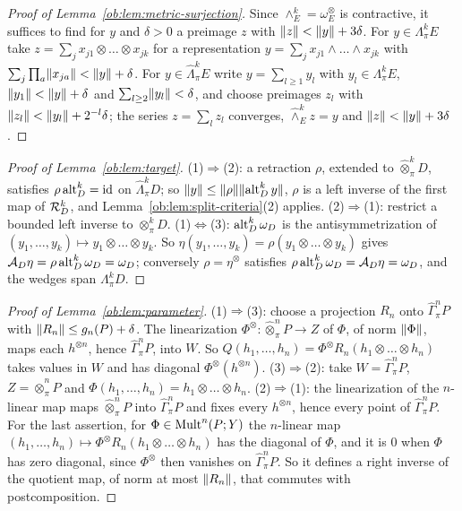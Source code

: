 \begin{proof}[Proof of Lemma~\ref{ob:lem:metric-surjection}]
Since $\wedge^k_E=\omega_E^\otimes$ is contractive, it suffices to find for $y$ and $\delta>0$ a preimage $z$ with
$\lVert z\rVert<\lVert y\rVert+3\delta$. For $y\in\Lambda^k_\pi E$ take $z=\sum_jx_{j1}\otimes\dots\otimes x_{jk}$ for a representation
$y=\sum_jx_{j1}\wedge\dots\wedge x_{jk}$ with $\sum_j\prod_a\lVert x_{ja}\rVert<\lVert y\rVert+\delta$. For
$y\in\widehat\Lambda^k_\pi E$ write $y=\sum_{l\ge1}y_l$ with $y_l\in\Lambda^k_\pi E$, $\lVert y_1\rVert<\lVert y\rVert+\delta$ and
$\sum_{l\ge2}\lVert y_l\rVert<\delta$, and choose preimages $z_l$ with $\lVert z_l\rVert<\lVert y_l\rVert+2^{-l}\delta$; the series
$z=\sum_lz_l$ converges, $\widehat\wedge^k_Ez=y$ and $\lVert z\rVert<\lVert y\rVert+3\delta$.
\end{proof}

\begin{proof}[Proof of Lemma~\ref{ob:lem:target}]
(1)$\Rightarrow$(2): a retraction $\rho$, extended to $\widehat\otimes^k_\pi D$, satisfies $\rho\operatorname{alt}^k_D=\mathrm{id}$ on
$\widehat\Lambda^k_\pi D$; so $\lVert y\rVert\le\lVert \rho\rVert\lVert \operatorname{alt}^k_Dy\rVert$, $\rho$ is a left inverse of the first map of
$\mathcal R^k_D$, and Lemma~\ref{ob:lem:split-criteria}(2) applies. (2)$\Rightarrow$(1): restrict a bounded left inverse to
$\otimes^k_\pi D$. (1)$\Leftrightarrow$(3): $\operatorname{alt}^k_D\omega_D$ is the antisymmetrization of
$(y_1,\dots,y_k)\mapsto y_1\otimes\dots\otimes y_k$. So $\eta(y_1,\dots,y_k)=\rho(y_1\otimes\dots\otimes y_k)$ gives
$\mathcal A_D\eta=\rho\operatorname{alt}^k_D\omega_D=\omega_D$; conversely $\rho=\eta^\otimes$ satisfies
$\rho\operatorname{alt}^k_D\omega_D=\mathcal A_D\eta=\omega_D$, and the wedges span $\Lambda^k_\pi D$.
\end{proof}

\begin{proof}[Proof of Lemma~\ref{ob:lem:parameter}]
(1)$\Rightarrow$(3): choose a projection $R_n$ onto $\widehat\Gamma^n_\pi P$ with $\lVert R_n\rVert\le g_n(P)+\delta$. The
linearization $\Phi^\otimes\colon\widehat\otimes^n_\pi P\to Z$ of $\Phi$, of norm $\lVert \Phi\rVert$, maps each $h^{\otimes n}$,
hence $\widehat\Gamma^n_\pi P$, into $W$. So $Q(h_1,\dots,h_n)=\Phi^\otimes R_n(h_1\otimes\dots\otimes h_n)$ takes values in
$W$ and has diagonal $\Phi^\otimes(h^{\otimes n})$. (3)$\Rightarrow$(2): take $W=\widehat\Gamma^n_\pi P$, $Z=\widehat\otimes^n_\pi P$ and
$\Phi(h_1,\dots,h_n)=h_1\otimes\dots\otimes h_n$. (2)$\Rightarrow$(1): the linearization of the $n$-linear map maps
$\widehat\otimes^n_\pi P$ into $\widehat\Gamma^n_\pi P$ and fixes every $h^{\otimes n}$, hence every point of
$\widehat\Gamma^n_\pi P$. For the last assertion, for
$\Phi\in\operatorname{Mult}^n(P;Y)$ the $n$-linear map $(h_1,\dots,h_n)\mapsto\Phi^\otimes R_n(h_1\otimes\dots\otimes h_n)$ has the
diagonal of $\Phi$, and it is $0$ when $\Phi$ has zero diagonal, since $\Phi^\otimes$ then vanishes on
$\widehat\Gamma^n_\pi P$. So it defines a right inverse of the quotient map, of norm at most $\lVert R_n\rVert$, that commutes
with postcomposition.
\end{proof}

